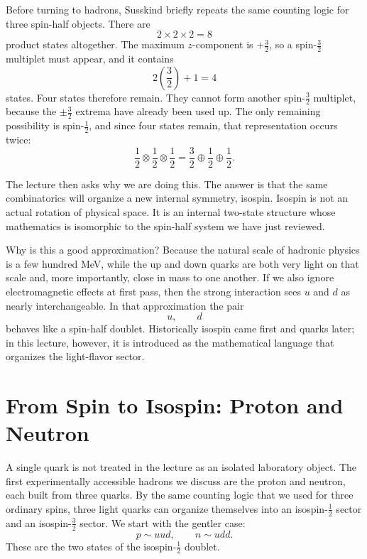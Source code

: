 Before turning to hadrons, Susskind briefly repeats the same counting logic for three spin-half objects. There are
\begin{equation}
2\times2\times2 = 8
\end{equation}
product states altogether. The maximum \(z\)-component is \(+\tfrac32\), so a spin-\(\tfrac32\) multiplet must appear, and it contains
\begin{equation}
2\left(\frac32\right)+1 = 4
\end{equation}
states. Four states therefore remain. They cannot form another spin-\(\tfrac32\) multiplet, because the \(\pm\tfrac32\) extrema have already been used up. The only remaining possibility is spin-\(\tfrac12\), and since four states remain, that representation occurs twice:
\begin{equation}
\frac12\otimes\frac12\otimes\frac12
=
\frac32\oplus\frac12\oplus\frac12.
\end{equation}

The lecture then asks why we are doing this. The answer is that the same combinatorics will organize a new internal symmetry, isospin. Isospin is not an actual rotation of physical space. It is an internal two-state structure whose mathematics is isomorphic to the spin-half system we have just reviewed.

Why is this a good approximation? Because the natural scale of hadronic physics is a few hundred MeV, while the up and down quarks are both very light on that scale and, more importantly, close in mass to one another. If we also ignore electromagnetic effects at first pass, then the strong interaction sees \(u\) and \(d\) as nearly interchangeable. In that approximation the pair
\[
u,\qquad d
\]
behaves like a spin-half doublet. Historically isospin came first and quarks later; in this lecture, however, it is introduced as the mathematical language that organizes the light-flavor sector.

\section{From Spin to Isospin: Proton and Neutron}

A single quark is not treated in the lecture as an isolated laboratory object. The first experimentally accessible hadrons we discuss are the proton and neutron, each built from three quarks. By the same counting logic that we used for three ordinary spins, three light quarks can organize themselves into an isospin-\(\tfrac12\) sector and an isospin-\(\tfrac32\) sector. We start with the gentler case:
\begin{equation}
p\sim uud,
\qquad
n\sim udd.
\end{equation}
These are the two states of the isospin-\(\tfrac12\) doublet.

